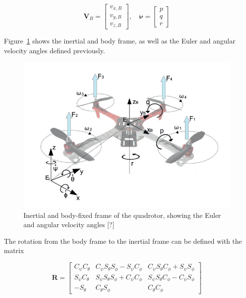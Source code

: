 \documentclass[letterpaper, 10 pt, conference]{ieeeconf}  %
\begin{document}
$$\bm{V}_{B}=\left[ \begin{array}{c}{v_{x, B}} \\ {v_{y, B}} \\ {v_{z, B}}\end{array}\right], \quad \bm{\nu}=\left[ \begin{array}{l}{p} \\ {q} \\ {r}\end{array}\right]$$


Figure~\ref{fig:quad_frame} shows the inertial and body frame, as well as the Euler and angular velocity angles defined previously.

\begin{figure}[!htpb]
	\centering
	\includegraphics[width=1.0\linewidth]{Images/quad_frame.png}
	\caption{Inertial and body-fixed frame of the quadrotor, showing the Euler and angular velocity angles [?] %
		}
	\label{fig:quad_frame}
\end{figure}


 The rotation from the body frame to the inertial frame can be defined with the matrix

$$\bm{R}=\left[ \begin{array}{ccc}{C_{\psi} C_{\theta}} & {C_{\psi} S_{\theta} S_{\phi}-S_{\psi} C_{\phi}} & {C_{\psi} S_{\theta} C_{\phi}+S_{\psi} S_{\phi}} \\ {S_{\psi} C_{\theta}} & {S_{\psi} S_{\theta} S_{\phi}+C_{\psi} C_{\phi}} & {S_{\psi} S_{\theta} C_{\phi}-C_{\psi} S_{\phi}} \\ {-S_{\theta}} & {C_{\theta} S_{\phi}} & {C_{\theta} C_{\phi}}\end{array}\right]$$
\end{document}
